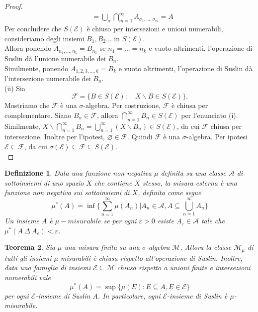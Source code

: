 \documentclass[a4paper, twoside,openright]{article}
\newcommand{\<}{\langle}
\renewcommand{\>}{\rangle}
\newtheorem{teo}{Teorema}[]
\newtheorem{defin}[teo]{Definizione}
\begin{document}
\begin{proof}
$$\begin{aligned}
		&=\bigcup_{\sigma} \bigcap_{m=1}^{\infty} A_{\sigma_{1}, \ldots, \sigma_{m}}=A
	\end{aligned}
	$$
	Per concludere che $S(\mathcal{E})$ è chiuso per intersezioni e unioni numerabili, consideriamo degli insiemi $B_1, B_2...$ in $S(\mathcal{E})$.\\
	Allora ponendo $A_{n_1,...,n_k}=B_{n_1}$ se $n_1=...=n_k$ e vuoto altrimenti, l'operazione di Suslin dà l'unione numerabile dei $B_n$.\\
	Similmente, ponendo $A_{1,2,3,...,k}=B_{k}$ e vuoto altrimenti,  l'operazione di Suslin dà l'intersezione numerabile dei $B_n$.\\
	(ii) Sia
	$$
	\mathcal{F}=\{B \in S(\mathcal{E}): \quad X \backslash B \in S(\mathcal{E})\} .
	$$
	Mostriamo che $\mathcal{F}$ è una $\sigma$-algebra. Per costruzione, $\mathcal{F}$ è chiusa per complementare. Siano $B_{n} \in \mathcal{F}$, allora $\bigcap_{n=1}^{\infty} B_{n} \in S(\mathcal{E})$ per l'enunciato (i). Similmente, $X \backslash \bigcap_{n=1}^{\infty} B_{n}=\bigcup_{n=1}^{\infty}\left(X \backslash B_{n}\right) \in S(\mathcal{E})$, da cui $\mathcal{F}$ chiusa per intersezione. Inoltre per l'ipotesi, $\varnothing \in \mathcal{F}$. Quindi $\mathcal{F}$ è una $\sigma$-algebra. Per ipotesi $\mathcal{E} \subseteq \mathcal{F}$, da cui $\sigma(\mathcal{E}) \subseteq \mathcal{F} \subseteq S(\mathcal{E})$.\\
\end{proof}

\begin{defin}
	Data una funzione non negativa $\mu$ definita su una classe $\mathcal{A}$ di sottoinsiemi di uno spazio $X$ che contiene $X$ stesso, la misura esterna è una funzione non negativa sui sottoinsiemi di $X$, definita come segue
	$$ \mu^*(A) = \inf \{ \sum_{n=1}^{\infty} \mu (A_n) | A_n \in \mathcal{A}, A \subseteq \bigcup_{n=1}^{\infty} A_n \} $$
	Un insieme $A$ è $\mu-misurabile$ se per ogni $\varepsilon > 0$ esiste $A_{\varepsilon} \in \mathcal{A}$ tale che $\mu^*(A \ \Delta \ A_{\varepsilon}) < \varepsilon$.
\end{defin}	


\begin{teo} \label{misurab}
	Sia $\mu$ una misura finita su una $\sigma$-algebra $\mathcal{M}$. Allora la classe $\mathcal{M}_{\mu}$ di tutti gli insiemi $\mu$-misurabili è chiusa rispetto all'operazione di Suslin. Inoltre, data una famiglia di insiemi $\mathcal{E} \subseteq \mathcal{M}$ chiusa rispetto a unioni finite e intersezioni numerabili vale
	$$
	\mu^{*}(A)=\sup \{\mu(E): E \subseteq A, E \in \mathcal{E}\}
	$$
	per ogni $\mathcal{E}$-insieme di Suslin $A$. In particolare, ogni $\mathcal{E}$-insieme di Suslin è $\mu$-misurabile.
\end{teo}
\end{document}
